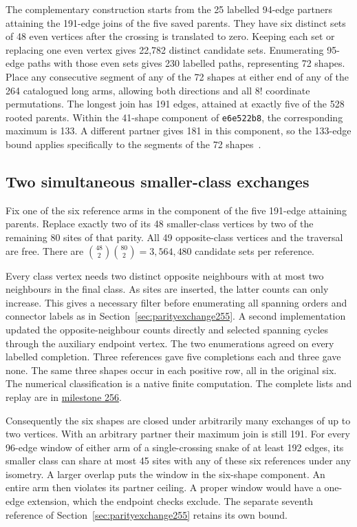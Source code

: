 \documentclass[11pt,a4paper]{article}
\theoremstyle{definition}
\theoremstyle{remark}
\begin{document}
The complementary construction starts from the 25 labelled 94-edge
partners attaining the 191-edge joins of the five saved parents.
They have six distinct sets of 48 even vertices after the crossing
is translated to zero. Keeping each set or replacing one even
vertex gives 22,782 distinct candidate sets. Enumerating 95-edge
paths with those even sets gives 230 labelled paths, representing
72 shapes. Place any consecutive segment of any of the 72 shapes
at either end of any of the 264 catalogued long arms, allowing both
directions and all $8!$ coordinate permutations. The longest join
has 191 edges, attained at exactly five of the 528 rooted parents.
Within the 41-shape component of \texttt{e6e522b8}, the corresponding
maximum is 133. A different partner gives 181 in this component, so
the 133-edge bound applies specifically to the segments of the
72 shapes~\cite{root248,exchange255}.

\subsection{Two simultaneous smaller-class exchanges}\label{sec:two256}
Fix one of the six reference arms in the component of the five
191-edge attaining parents. Replace exactly two of its 48 smaller-class
vertices by two of the remaining 80 sites of that parity. All 49
opposite-class vertices and the traversal are free. There are
\(\binom{48}{2}\binom{80}{2}=3{,}564{,}480\) candidate sets per reference.

Every class vertex needs two distinct opposite neighbours with at most
two neighbours in the final class. As sites are inserted, the latter
counts can only increase. This gives a necessary filter before enumerating
all spanning orders and connector labels as in Section~\ref{sec:parityexchange255}.
A second implementation updated the opposite-neighbour counts directly
and selected spanning cycles through the auxiliary endpoint vertex.
The two enumerations agreed on every labelled completion. Three references
gave five completions each and three gave none. The same three shapes
occur in each positive row, all in the original six. The numerical
classification is a native finite computation. The complete lists and
replay are in \href{https://github.com/hironaka-iori/Snake-in-the-box-in-9/tree/main/milestones/256-two-exchange-parents}{milestone 256}.

Consequently the six shapes are closed under arbitrarily many exchanges
of up to two vertices. With an arbitrary partner their maximum join
is still 191. For every 96-edge window of either arm of a single-crossing
snake of at least 192 edges, its smaller class can share at most 45 sites
with any of these six references under any isometry. A larger overlap
puts the window in the six-shape component. An entire arm then violates
its partner ceiling. A proper window would have a one-edge extension,
which the endpoint checks exclude. The separate seventh reference of
Section~\ref{sec:parityexchange255} retains its own bound.
\end{document}

